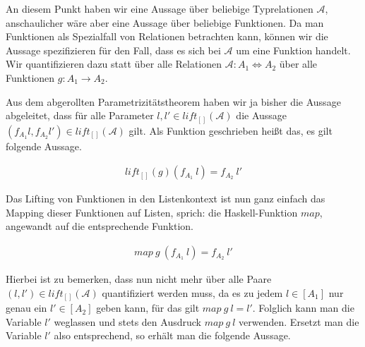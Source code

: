 
An diesem Punkt haben wir eine Aussage über beliebige Typrelationen $\mathcal{A}$, anschaulicher wäre aber eine Aussage
über beliebige Funktionen. Da man Funktionen als Spezialfall von Relationen betrachten kann, können wir die Aussage
spezifizieren für den Fall, dass es sich bei $\mathcal{A}$ um eine Funktion handelt. Wir quantifizieren dazu statt
über alle Relationen $\mathcal{A} : A_1 \Leftrightarrow A_2$ über alle Funktionen $g : A_1 \rightarrow A_2$.

Aus dem abgerollten Parametrizitätstheorem haben wir ja bisher die Aussage abgeleitet, dass für alle Parameter $l, l' \in lift_{[]}(\mathcal{A})$
die Aussage $(f_{A_1} l, f_{A_2} l') \in lift_{[]}(\mathcal{A})$ gilt. Als Funktion geschrieben heißt das, es gilt folgende Aussage.

\begin{align*}
lift_{[]}(g) (f_{A_1}\ l) = f_{A_2}\ l'
\end{align*}

Das Lifting von Funktionen in den Listenkontext ist nun ganz einfach das Mapping dieser Funktionen auf Listen, sprich: die Haskell-Funktion
$map$, angewandt auf die entsprechende Funktion.

\begin{align*}
map\ g\ (f_{A_1}\ l) = f_{A_2}\ l'
\end{align*}

Hierbei ist zu bemerken, dass nun nicht mehr über alle Paare $(l, l') \in lift_{[]}(\mathcal{A})$
quantifiziert werden muss, da es zu jedem $l \in [A_1]$ nur genau ein $l' \in [A_2]$ geben kann, für das gilt $map\ g\ l = l'$. Folglich kann man die Variable $l'$
weglassen und stets den Ausdruck $map\ g\ l$ verwenden.
Ersetzt man die Variable $l'$ also entsprechend, so erhält man die folgende Aussage.


